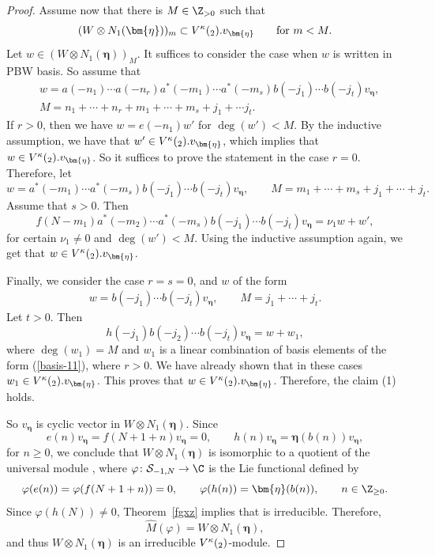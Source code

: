 \documentclass[10pt,a4paper]{amsart}
\numberwithin{equation}{section}
\theoremstyle{definition}
\newcommand{\1}{\textbf{1}}
\begin{document}
\begin{proof}
Assume now that there is $M \in {\Z}_{>0}$ such that
 \[( W \otimes N_1(\bm{\eta}) )_m \subset V^{\kappa}(\sl_2). v_{\bm{\eta}} \qquad \mbox{for} \ m < M. \]
Let $w \in ( W\otimes N_1(\bm{\eta}) )_M$. It suffices to consider the case when $w $ is written in PBW basis. So assume that
\begin{align}
&w=a(-n_1)\cdots a(-n_r)a^*(-m_1)\cdots a^*(-m_s)b(-j_1)\cdots b(-j_t)v_{\bm{\eta}}, \label{basis-11} \\
&M= n_1 + \cdots + n_r + m_1 +\cdots + m_s + j_1 +\cdots j_t. \nonumber
\end{align}
If $r >0$, then we have $ w= e(-n_1) w'$ for $\deg(w') < M$. By the inductive assumption, we have that $w ' \in V^{\kappa}(\sl_2). v_{\bm{\eta}}$, which implies that $w \in V^{\kappa}(\sl_2). v_{\bm{\eta}}$.
So it suffices to prove the statement in the case $r=0$. Therefore, let
 \[w= a^*(-m_1) \cdots a^* (-m_s) b(-j_1) \cdots b(-j_t) v_{\bm{\eta}}, \qquad
  M= m_1 +\cdots + m_s + j_1 +\cdots +j_t. \]
Assume that $s >0$. Then
 \[ f(N-m_1) a^*(-m_2) \cdots a^* (-m_s) b(-j_1) \cdots b(-j_t) v_{\bm{\eta}} = \nu_1 w + w', \]
for certain $\nu_1 \ne 0$ and $\deg(w') <M$. Using the inductive assumption again, we get that $w \in V^{\kappa}(\sl_2). v_{\bm{\eta}}$.

Finally, we consider the case $r= s=0$, and $w$ of the form
 \begin{align*}
 w= b(-j_1) \cdots b(-j_t) v_{\bm{\eta}}, \qquad
 M= j_1 +\cdots +j_t.
 \end{align*}
Let $t >0$. Then
 \[ h(-j_1) b(-j_2) \cdots b(-j_t) v_{\bm{\eta}} = w + w_1, \]
where $\deg(w_1) = M $ and $w_1$ is a linear combination of basis elements of the form (\ref{basis-11}), where ${r >0}$. We have already shown that in these cases $w_1 \in V^{\kappa}(\sl_2). v_{\bm{\eta}}$. This proves that $w \in V^{\kappa}(\sl_2). v_{\bm{\eta}}$. Therefore, the claim (1) holds.

So $v_{\bm{\eta}}$ is cyclic vector in $ W\otimes N_1({\bm{\eta}})$. Since
 \[ e(n) v_ {\bm{\eta}} = f(N+1 + n) v_ {\bm{\eta}} =0, \qquad h(n) v_ {\bm{\eta}} = {\bm{\eta}} (b(n)) v_ {\bm{\eta}}, \]
 for $n\geq 0$,
we conclude that $ W\otimes N_1({\bm{\eta}})$ is isomorphic to a quotient of the universal module , where
$ \varphi\colon \mathcal S_{-1, N} \rightarrow {\C}$ is the Lie functional defined by
 \[ \varphi(e(n)) = \varphi(f(N+1+ n)) =0, \qquad \varphi(h(n)) = {\bm{\eta}} (b(n)), \qquad n \in {\Z}_{\ge 0}. \]
Since $ \varphi(h(N)) \ne 0$, Theorem~\ref{fgxz} implies that  is irreducible. Therefore,
 \[ \widehat{M}(\varphi) = W \otimes N_1({\bm{\eta}}), \]
and thus $W\otimes N_1({\bm{\eta}})$ is an irreducible $ V^{\kappa}(\sl_2)$-module.
\end{proof}
\end{document}
